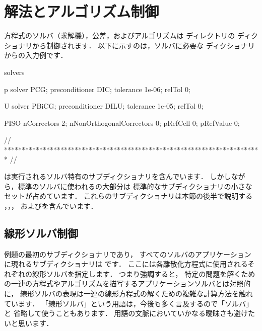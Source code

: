 \section{解法とアルゴリズム制御}
\label{sec:4.5}
方程式のソルバ（求解機），公差，およびアルゴリズムは
ディレクトリの
%
%
ディクショナリから制御されます．
以下に示すのは，ソルバに必要な
ディクショナリからの入力例です．
\begin{OFverbatim}[file, linenum=17]

solvers
{
    p
    {
        solver           PCG;
        preconditioner   DIC;
        tolerance        1e-06;
        relTol           0;
    }

    U
    {
        solver           PBiCG;
        preconditioner   DILU;
        tolerance        1e-05;
        relTol           0;
    }
}

PISO
{
    nCorrectors     2;
    nNonOrthogonalCorrectors 0;
    pRefCell        0;
    pRefValue       0;
}


// ************************************************************************* //
\end{OFverbatim}%
\label{p:U-117}%
は実行されるソルバ特有のサブディクショナリを含んでいます．
しかしながら，標準のソルバに使われるの大部分は
標準的なサブディクショナリの小さなセットが占めています．
これらのサブディクショナリは本節の後半で説明する
，，，
およびを含んでいます．


\subsection{線形ソルバ制御}
\label{ssec:4.5.1}
例題の最初のサブディクショナリであり，
すべてのソルバのアプリケーションに現れるサブディクショナリは
%
%
です．
ここには各離散化方程式に使用されるそれぞれの線形ソルバを指定します．
つまり強調すると，
特定の問題を解くための一連の方程式やアルゴリズムを描写するアプリケーションソルバとは対照的に，
線形ソルバの表現は一連の線形方程式の解くための複雑な計算方法を触れています．
「線形ソルバ」という用語は，今後も多く言及するので「ソルバ」と
省略して使うこともあります．
用語の文脈においていかなる曖昧さも避けたいと思います．

